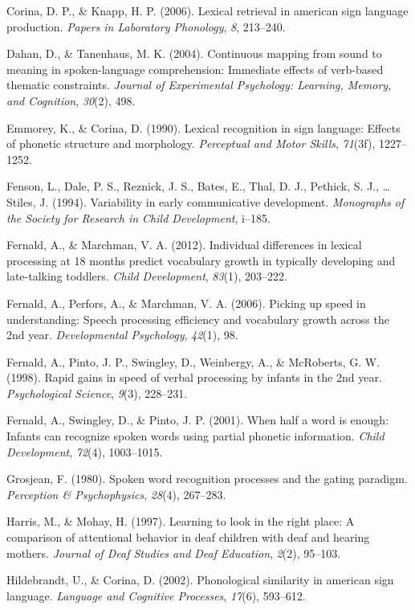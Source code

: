 \documentclass[12pt,]{article}
\begin{document}
Corina, D. P., \& Knapp, H. P. (2006). Lexical retrieval in american
sign language production. \emph{Papers in Laboratory Phonology},
\emph{8}, 213--240.

Dahan, D., \& Tanenhaus, M. K. (2004). Continuous mapping from sound to
meaning in spoken-language comprehension: Immediate effects of
verb-based thematic constraints. \emph{Journal of Experimental
Psychology: Learning, Memory, and Cognition}, \emph{30}(2), 498.

Emmorey, K., \& Corina, D. (1990). Lexical recognition in sign language:
Effects of phonetic structure and morphology. \emph{Perceptual and Motor
Skills}, \emph{71}(3f), 1227--1252.

Fenson, L., Dale, P. S., Reznick, J. S., Bates, E., Thal, D. J.,
Pethick, S. J., \ldots{} Stiles, J. (1994). Variability in early
communicative development. \emph{Monographs of the Society for Research
in Child Development}, i--185.

Fernald, A., \& Marchman, V. A. (2012). Individual differences in
lexical processing at 18 months predict vocabulary growth in typically
developing and late-talking toddlers. \emph{Child Development},
\emph{83}(1), 203--222.

Fernald, A., Perfors, A., \& Marchman, V. A. (2006). Picking up speed in
understanding: Speech processing efficiency and vocabulary growth across
the 2nd year. \emph{Developmental Psychology}, \emph{42}(1), 98.

Fernald, A., Pinto, J. P., Swingley, D., Weinbergy, A., \& McRoberts, G.
W. (1998). Rapid gains in speed of verbal processing by infants in the
2nd year. \emph{Psychological Science}, \emph{9}(3), 228--231.

Fernald, A., Swingley, D., \& Pinto, J. P. (2001). When half a word is
enough: Infants can recognize spoken words using partial phonetic
information. \emph{Child Development}, \emph{72}(4), 1003--1015.

Grosjean, F. (1980). Spoken word recognition processes and the gating
paradigm. \emph{Perception \& Psychophysics}, \emph{28}(4), 267--283.

Harris, M., \& Mohay, H. (1997). Learning to look in the right place: A
comparison of attentional behavior in deaf children with deaf and
hearing mothers. \emph{Journal of Deaf Studies and Deaf Education},
\emph{2}(2), 95--103.

Hildebrandt, U., \& Corina, D. (2002). Phonological similarity in
american sign language. \emph{Language and Cognitive Processes},
\emph{17}(6), 593--612.
\end{document}
